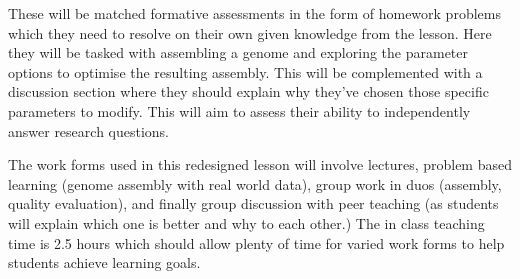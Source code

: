 \documentclass[paper=a4,justified,a4paper]{tufte-handout}
\begin{document}
These will be matched formative assessments in the form of homework
problems which they need to resolve on their own given knowledge from
the lesson. Here they will be tasked with assembling a genome and
exploring the parameter options to optimise the resulting assembly. This
will be complemented with a discussion section where they should explain
why they've chosen those specific parameters to modify. This will aim to
assess their ability to independently answer research questions.

The work forms used in this redesigned lesson will involve lectures,
problem based learning (genome assembly with real world data), group
work in duos (assembly, quality evaluation), and finally group
discussion with peer teaching (as students will explain which one is
better and why to each other.) The in class teaching time is 2.5 hours
which should allow plenty of time for varied work forms to help students
achieve learning goals.


\end{document}
